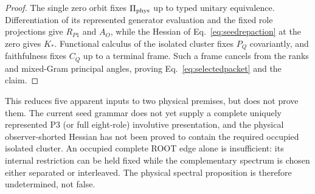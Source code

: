 \begin{proof}
The single zero orbit fixes $\Pi_{\rm phys}$ up to typed unitary equivalence.
Differentiation of its represented generator evaluation and the fixed role
projections give $R_{P1}$ and $A_O$, while the Hessian of
Eq.~\eqref{eq:seedrepaction} at the zero gives $K_*$.  Functional calculus of
the isolated cluster fixes $P_Q$ covariantly, and faithfulness fixes $C_Q$ up
to a terminal frame.  Such a frame cancels from the ranks and mixed-Gram
principal angles, proving Eq.~\eqref{eq:selectedpacket} and the claim.
\end{proof}

This reduces five apparent inputs to two physical premises, but does not
prove them.  The current seed grammar does not yet supply a complete uniquely
represented P3 (or full eight-role) involutive presentation, and the physical
observer-shorted Hessian has not been proved to contain the required occupied
isolated cluster.  An occupied complete ROOT edge alone is insufficient: its
internal restriction can be held fixed while the complementary spectrum is
chosen either separated or interleaved.  The physical spectral proposition is
therefore undetermined, not false.

